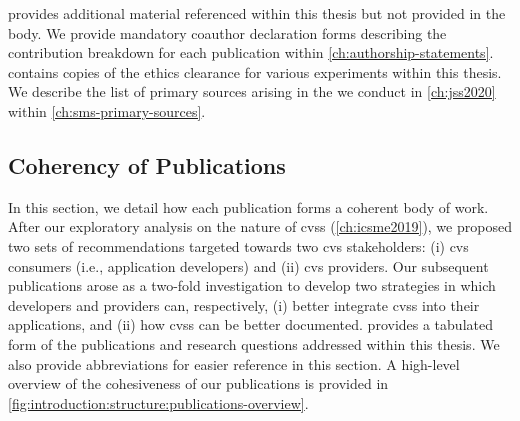  provides additional material referenced within this thesis but not provided in the body. We provide mandatory coauthor declaration forms describing the contribution breakdown for each publication within \cref{ch:authorship-statements}.  contains copies of the ethics clearance for various experiments within this thesis. We describe the list of primary sources arising in the  we conduct in \cref{ch:jss2020} within \cref{ch:sms-primary-sources}.


\subsection{Coherency of Publications}

In this section, we detail how each publication forms a coherent body of work. After our exploratory analysis on the nature of \glspl{cvs} (\cref{ch:icsme2019}), we proposed two sets of recommendations targeted towards two \gls{cvs} stakeholders: (i) \gls{cvs} consumers (i.e., application developers) and (ii) \gls{cvs} providers. Our subsequent publications arose as a two-fold investigation to develop two strategies in which developers and providers can, respectively, (i) better integrate \glspl{cvs} into their applications, and (ii) how \glspl{cvs} can be better documented.  provides a tabulated form of the publications and research questions addressed within this thesis. We also provide abbreviations for easier reference in this section. A high-level overview of the cohesiveness of our publications is provided in \cref{fig:introduction:structure:publications-overview}.

